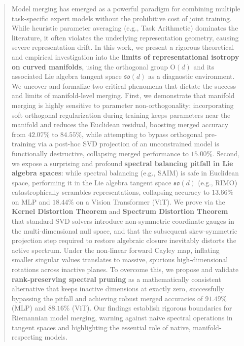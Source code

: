 \begin{abstract}
Model merging has emerged as a powerful paradigm for combining multiple task-specific expert models without the prohibitive cost of joint training. While heuristic parameter averaging (e.g., Task Arithmetic) dominates the literature, it often violates the underlying representation geometry, causing severe representation drift. In this work, we present a rigorous theoretical and empirical investigation into the \textbf{limits of representational isotropy on curved manifolds}, using the orthogonal group $\mathrm{O}(d)$ and its associated Lie algebra tangent space $\mathfrak{so}(d)$ as a diagnostic environment. We uncover and formalize two critical phenomena that dictate the success and limits of manifold-level merging. First, we demonstrate that manifold merging is highly sensitive to parameter non-orthogonality; incorporating soft orthogonal regularization during training keeps parameters near the manifold and reduces the Euclidean residual, boosting merged accuracy from $42.07\%$ to $84.55\%$, while attempting to bypass orthogonal pre-training via a post-hoc SVD projection of an unconstrained model is functionally destructive, collapsing merged performance to $15.00\%$. Second, we expose a surprising and profound \textbf{spectral balancing pitfall in Lie algebra spaces}: while spectral balancing (e.g., SAIM) is safe in Euclidean space, performing it in the Lie algebra tangent space $\mathfrak{so}(d)$ (e.g., RIMO) catastrophically scrambles representations, collapsing accuracy to $13.66\%$ on MLP and $18.44\%$ on a Vision Transformer (ViT). We prove via the \textbf{Kernel Distortion Theorem} and \textbf{Spectrum Distortion Theorem} that standard SVD solvers introduce non-symmetric coordinate gauges in the multi-dimensional null space, and that the subsequent skew-symmetric projection step required to restore algebraic closure inevitably distorts the active spectrum. Under the non-linear forward Cayley map, inflating smaller singular values translates to massive, spurious high-dimensional rotations across inactive planes. To overcome this, we propose and validate \textbf{rank-preserving spectral pruning} as a mathematically consistent alternative that keeps inactive dimensions at exactly zero, successfully bypassing the pitfall and achieving robust merged accuracies of $91.49\%$ (MLP) and $88.16\%$ (ViT). Our findings establish rigorous boundaries for Riemannian model merging, warning against naive spectral operations in tangent spaces and highlighting the essential role of native, manifold-respecting models.
\end{abstract}
